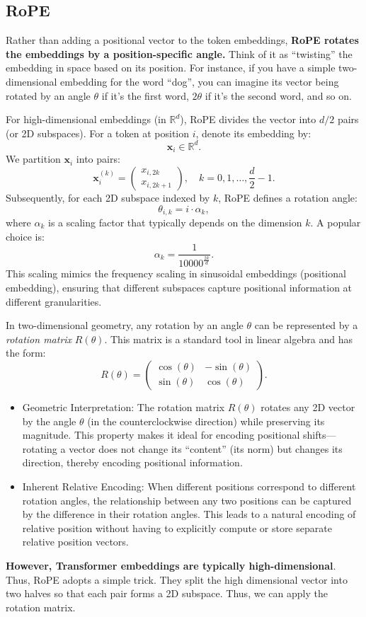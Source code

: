 \subsection{RoPE}

Rather than adding a positional vector to the token embeddings, \textbf{RoPE rotates the embeddings by a position-specific angle.} Think of it as ``twisting'' the embedding in space based on its position. For instance, if you have a simple two-dimensional embedding for the word ``dog'', you can imagine its vector being rotated by an angle \(\theta\) if it's the first word, \(2\theta\) if it’s the second word, and so on.

For high-dimensional embeddings (\eg in \(\mathbb{R}^d\)), RoPE divides the vector into \(d/2\) pairs (or 2D subspaces). For a token at position \(i\), denote its embedding by:
\[
\mathbf{x}_i \in \mathbb{R}^d.
\]
We partition \(\mathbf{x}_i\) into pairs:
\[
\mathbf{x}_i^{(k)} = 
\begin{pmatrix}
x_{i,2k} \\
x_{i,2k+1}
\end{pmatrix},\quad k = 0, 1, \ldots, \frac{d}{2}-1.
\]
Subsequently, for each 2D subspace indexed by \(k\), RoPE defines a rotation angle:
\[
\theta_{i, k} = i \cdot \alpha_k,
\]
where \(\alpha_k\) is a scaling factor that typically depends on the dimension \(k\). A popular choice is:
\[
\alpha_k = \frac{1}{10000^{\frac{2k}{d}}}.
\]
This scaling mimics the frequency scaling in sinusoidal embeddings (\ie positional embedding), ensuring that different subspaces capture positional information at different granularities.

In two-dimensional geometry, any rotation by an angle \(\theta\) can be represented by a \textit{rotation matrix} \(R(\theta)\). This matrix is a standard tool in linear algebra and has the form:
\[
R(\theta) = 
\begin{pmatrix}
\cos(\theta) & -\sin(\theta) \\
\sin(\theta) & \cos(\theta)
\end{pmatrix}.
\]
\begin{itemize}
	\item Geometric Interpretation: The rotation matrix \(R(\theta)\) rotates any 2D vector by the angle \(\theta\) (in the counterclockwise direction) while preserving its magnitude. This property makes it ideal for encoding positional shifts—rotating a vector does not change its ``content'' (its norm) but changes its direction, thereby encoding positional information.
	\item Inherent Relative Encoding: When different positions correspond to different rotation angles, the relationship between any two positions can be captured by the difference in their rotation angles. This leads to a natural encoding of relative position without having to explicitly compute or store separate relative position vectors.
\end{itemize}
\textbf{However, Transformer embeddings are typically high-dimensional}. Thus, RoPE adopts a simple trick. They split the high dimensional vector into two halves so that each pair forms a 2D subspace. Thus, we can apply the rotation matrix.

